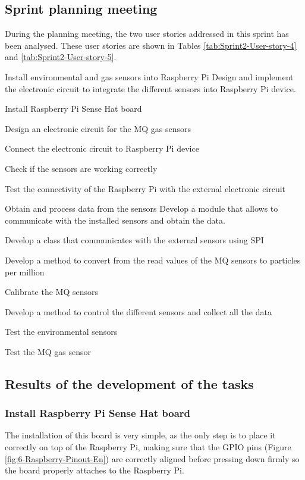 \subsection{Sprint planning meeting}
During the planning meeting, the two user stories addressed in this sprint has been analysed. These user stories are shown in Tables \ref{tab:Sprint2-User-story-4} and \ref{tab:Sprint2-User-story-5}.

{Install environmental and gas sensors into Raspberry Pi}
{Design and implement the electronic circuit to integrate the different sensors into Raspberry Pi device.}
{	\item Install Raspberry Pi Sense Hat board
	\item Design an electronic circuit for the MQ gas sensors
	\item Connect the electronic circuit to Raspberry Pi device
}{	\item Check if the sensors are working correctly
	\item Test the connectivity of the Raspberry Pi with the external electronic circuit
}

{Obtain and process data from the sensors}
{Develop a module that allows to communicate with the installed sensors and obtain the data.}
{	\item Develop a class that communicates with the external sensors using \ac{SPI}
	\item Develop a method to convert from the read values of the MQ sensors to particles per million
	\item Calibrate the MQ sensors
	\item Develop a method to control the different sensors and collect all the data
}{	\item Test the environmental sensors
	\item Test the MQ gas sensor
}


\subsection{Results of the development of the tasks}

\subsubsection{Install Raspberry Pi Sense Hat board}
The installation of this board is very simple, as the only step is to place it correctly on top of the Raspberry Pi, making sure that the GPIO pins (Figure \ref{fig:6-Raspberry-Pinout-En}) are correctly aligned before pressing down firmly so the board properly attaches to the Raspberry Pi.

